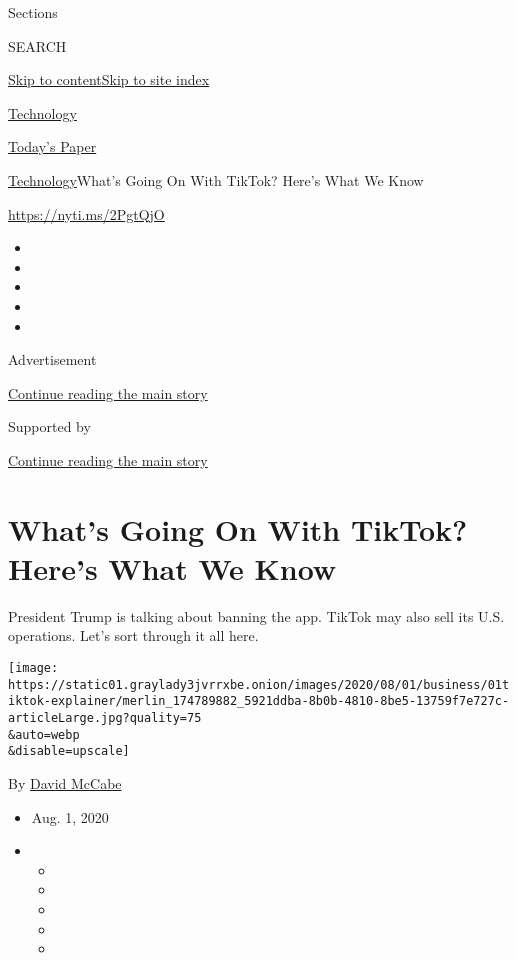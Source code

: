 Sections

SEARCH

\protect\hyperlink{site-content}{Skip to
content}\protect\hyperlink{site-index}{Skip to site index}

\href{https://www.nytimes3xbfgragh.onion/section/technology}{Technology}

\href{https://myaccount.nytimes3xbfgragh.onion/auth/login?response_type=cookie\&client_id=vi}{}

\href{https://www.nytimes3xbfgragh.onion/section/todayspaper}{Today's
Paper}

\href{/section/technology}{Technology}\textbar{}What's Going On With
TikTok? Here's What We Know

\url{https://nyti.ms/2PgtQjO}

\begin{itemize}
\item
\item
\item
\item
\item
\end{itemize}

Advertisement

\protect\hyperlink{after-top}{Continue reading the main story}

Supported by

\protect\hyperlink{after-sponsor}{Continue reading the main story}

\hypertarget{whats-going-on-with-tiktok-heres-what-we-know}{%
\section{What's Going On With TikTok? Here's What We
Know}\label{whats-going-on-with-tiktok-heres-what-we-know}}

President Trump is talking about banning the app. TikTok may also sell
its U.S. operations. Let's sort through it all here.

\texttt{[image: https://static01.graylady3jvrrxbe.onion/images/2020/08/01/business/01tiktok-explainer/merlin\_174789882\_5921ddba-8b0b-4810-8be5-13759f7e727c-articleLarge.jpg?quality=75\\\&auto=webp\\\&disable=upscale]}

By \href{https://www.nytimes3xbfgragh.onion/by/david-mccabe}{David
McCabe}

\begin{itemize}
\item
  Aug. 1, 2020
\item
  \begin{itemize}
  \item
  \item
  \item
  \item
  \item
  \end{itemize}
\end{itemize}

